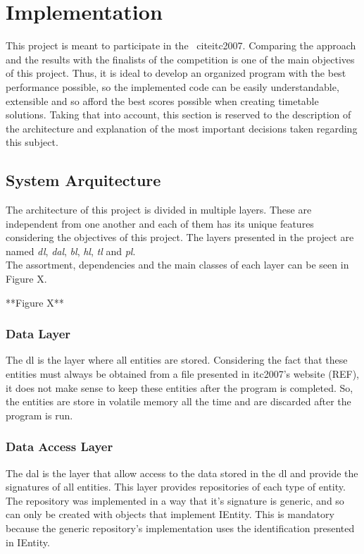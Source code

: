 \chapter{Implementation}
\label{implementation}
\thispagestyle{plain}

This project is meant to participate in the ~cite{itc2007}. Comparing the approach and the results with the finalists of the competition is one of the main objectives of this project. Thus, it is ideal to develop an organized program with the best performance possible, so the implemented code can be easily understandable, extensible and so afford the best scores possible when creating timetable solutions. Taking that into account, this section is reserved to the description of the architecture and explanation of the most important decisions taken regarding this subject.

\section{System Arquitecture}

The architecture of this project is divided in multiple layers. These are independent from one another and each of them has its unique features considering the objectives of this project. The layers presented in the project are named \textit{\gls{dl}}, \textit{\gls{dal}}, \textit{\gls{bl}}, \textit{\gls{hl}}, \textit{\gls{tl}} and \textit{\gls{pl}}. \\

The assortment, dependencies and the main classes of each layer can be seen in Figure X.

**Figure X**

\subsection{Data Layer}

The \gls{dl} is the layer where all entities are stored. Considering the fact that these entities must always be obtained from a file presented in \gls{itc2007}'s website (REF), it does not make sense to keep these entities after the program is completed. So, the entities are store in volatile memory all the time and are discarded after the program is run.

\subsection{Data Access Layer}

The \gls{dal} is the layer that allow access to the data stored in the \gls{dl} and provide the signatures of all entities. This layer provides repositories of each type of entity. The repository was implemented in a way that it's signature  is generic, and so can only be created with objects that implement IEntity. This is mandatory because the generic repository's implementation uses the identification presented in IEntity. \\

